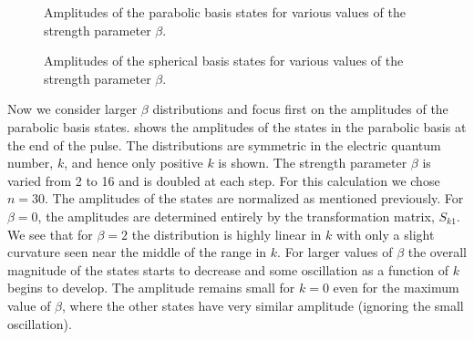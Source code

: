\begin{figure}[tbp]
\bigskip
{} {Amplitudes of the parabolic
basis states for various values of the strength parameter $\beta$.
\label{ampk}}
\end{figure}

\begin{figure}[tbp]
\bigskip
{} {Amplitudes of the spherical
basis states for various values of the strength parameter $\beta$.
\label{ampl}}
\end{figure}

Now we consider larger $\beta$ distributions and focus first on the amplitudes
of the parabolic basis states.   shows the amplitudes of the
states in the parabolic basis at the end of the pulse.  The distributions are
symmetric in the electric quantum number, $k$, and hence only positive $k$ is
shown.  The strength parameter $\beta$ is varied from 2 to 16 and is doubled at
each step.  For this calculation we chose $n = 30$.  The amplitudes of the
states are normalized as mentioned previously.  For $\beta=0$, the amplitudes
are determined entirely by the transformation matrix, $S_{k1}$.  We see
that for $\beta = 2$ the distribution is highly linear in $k$
with only a slight curvature seen near the middle of the range in $k$. For
larger values of $\beta$ the overall magnitude of the states starts to decrease
and some oscillation as a function of $k$ begins to develop.  The amplitude
remains small for $k=0$ even for the maximum value of $\beta$, where the other
states have very similar amplitude (ignoring the small oscillation).
 
